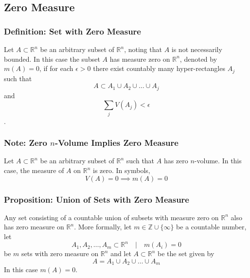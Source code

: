 \documentclass[11pt, a4paper]{article}
\begin{document}
\subsection{Zero Measure}

\subsubsection{Definition: Set with Zero Measure}
Let $ A \subset \mathbb{R}^n $	be an arbitrary subset of $ \mathbb{R}^n $, noting that $ A $ is not necessarily bounded. In this case the subset $ A $ has measure zero on $ \mathbb{R}^n $, denoted by $ m(A) = 0 $, if for each $ \epsilon > 0 $ there exist countably many hyper-rectangles $ A_j $ such that	\begin{equation*}
	A \subset A_1 \cup A_2 \cup \dots \cup A_j 
\end{equation*}
and
\begin{equation*}
	\sum_j V(A_j) < \epsilon
\end{equation*}.

\subsubsection{Note: Zero $ n $-Volume Implies Zero Measure}
Let $ A \subset \mathbb{R}^n $	be an arbitrary subset of $ \mathbb{R}^n $ such that $ A $ has zero $ n $-volume. In this case, the measure of $ A $ on $ \mathbb{R}^n $ is zero. In symbols,
\begin{equation*}
	V(A) = 0 \implies m(A) = 0
\end{equation*}

\subsubsection{Proposition: Union of Sets with Zero Measure}
Any set consisting of a countable union of subsets with measure zero on $ \mathbb{R}^n $ also has zero measure on $ \mathbb{R}^n $. More formally, let $ m \in \mathbb{Z} \cup \{\infty\} $ be a countable number, let
\begin{equation*}
A_1, A_2, \dots, A_m \subset \mathbb{R}^n \quad | \quad m(A_i) = 0
\end{equation*}
be $ m $ sets with zero measure on $ \mathbb{R}^n $ and let $ A \subset \mathbb{R}^n $ be the set given by 
\begin{equation*}
A = A_1 \cup A_2 \cup \dots \cup A_m 
\end{equation*}
In this case $ m(A) = 0 $.
\end{document}
